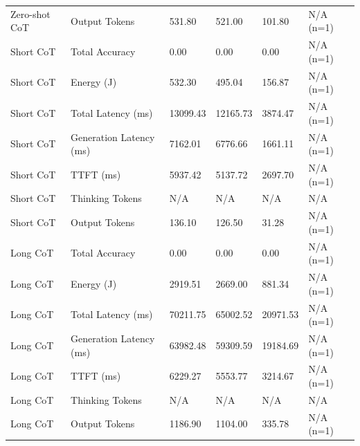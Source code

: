 \begin{table}
\begin{tabular}{llllll}
Zero-shot CoT & Output Tokens & 531.80 & 521.00 & 101.80 & N/A (n=1) \\
Short CoT & Total Accuracy & 0.00 & 0.00 & 0.00 & N/A (n=1) \\
Short CoT & Energy (J) & 532.30 & 495.04 & 156.87 & N/A (n=1) \\
Short CoT & Total Latency (ms) & 13099.43 & 12165.73 & 3874.47 & N/A (n=1) \\
Short CoT & Generation Latency (ms) & 7162.01 & 6776.66 & 1661.11 & N/A (n=1) \\
Short CoT & TTFT (ms) & 5937.42 & 5137.72 & 2697.70 & N/A (n=1) \\
Short CoT & Thinking Tokens & N/A & N/A & N/A & N/A \\
Short CoT & Output Tokens & 136.10 & 126.50 & 31.28 & N/A (n=1) \\
Long CoT & Total Accuracy & 0.00 & 0.00 & 0.00 & N/A (n=1) \\
Long CoT & Energy (J) & 2919.51 & 2669.00 & 881.34 & N/A (n=1) \\
Long CoT & Total Latency (ms) & 70211.75 & 65002.52 & 20971.53 & N/A (n=1) \\
Long CoT & Generation Latency (ms) & 63982.48 & 59309.59 & 19184.69 & N/A (n=1) \\
Long CoT & TTFT (ms) & 6229.27 & 5553.77 & 3214.67 & N/A (n=1) \\
Long CoT & Thinking Tokens & N/A & N/A & N/A & N/A \\
Long CoT & Output Tokens & 1186.90 & 1104.00 & 335.78 & N/A (n=1) \\
\bottomrule
\end{tabular}
\end{table}
